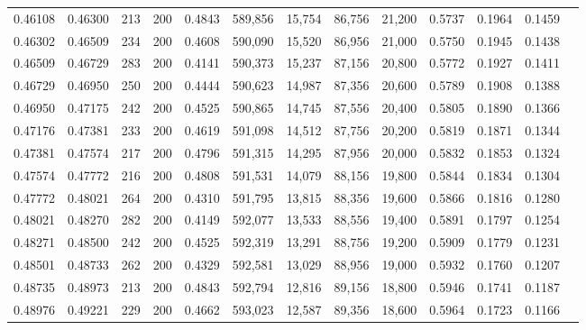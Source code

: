 \begin{tabular}{rrrrrrrrrrrrr}
0.46108 & 0.46300 &    213 & 200 &                                     0.4843 & 589,856 &  15,754 &  86,756 &  21,200 & 0.5737 & 0.1964 & 0.1459 \\
0.46302 & 0.46509 &    234 & 200 &                                     0.4608 & 590,090 &  15,520 &  86,956 &  21,000 & 0.5750 & 0.1945 & 0.1438 \\
0.46509 & 0.46729 &    283 & 200 &                                     0.4141 & 590,373 &  15,237 &  87,156 &  20,800 & 0.5772 & 0.1927 & 0.1411 \\
0.46729 & 0.46950 &    250 & 200 &                                     0.4444 & 590,623 &  14,987 &  87,356 &  20,600 & 0.5789 & 0.1908 & 0.1388 \\
0.46950 & 0.47175 &    242 & 200 &                                     0.4525 & 590,865 &  14,745 &  87,556 &  20,400 & 0.5805 & 0.1890 & 0.1366 \\
0.47176 & 0.47381 &    233 & 200 &                                     0.4619 & 591,098 &  14,512 &  87,756 &  20,200 & 0.5819 & 0.1871 & 0.1344 \\
0.47381 & 0.47574 &    217 & 200 &                                     0.4796 & 591,315 &  14,295 &  87,956 &  20,000 & 0.5832 & 0.1853 & 0.1324 \\
0.47574 & 0.47772 &    216 & 200 &                                     0.4808 & 591,531 &  14,079 &  88,156 &  19,800 & 0.5844 & 0.1834 & 0.1304 \\
0.47772 & 0.48021 &    264 & 200 &                                     0.4310 & 591,795 &  13,815 &  88,356 &  19,600 & 0.5866 & 0.1816 & 0.1280 \\
0.48021 & 0.48270 &    282 & 200 &                                     0.4149 & 592,077 &  13,533 &  88,556 &  19,400 & 0.5891 & 0.1797 & 0.1254 \\
0.48271 & 0.48500 &    242 & 200 &                                     0.4525 & 592,319 &  13,291 &  88,756 &  19,200 & 0.5909 & 0.1779 & 0.1231 \\
0.48501 & 0.48733 &    262 & 200 &                                     0.4329 & 592,581 &  13,029 &  88,956 &  19,000 & 0.5932 & 0.1760 & 0.1207 \\
0.48735 & 0.48973 &    213 & 200 &                                     0.4843 & 592,794 &  12,816 &  89,156 &  18,800 & 0.5946 & 0.1741 & 0.1187 \\
0.48976 & 0.49221 &    229 & 200 &                                     0.4662 & 593,023 &  12,587 &  89,356 &  18,600 & 0.5964 & 0.1723 & 0.1166 \\

\end{tabular}
